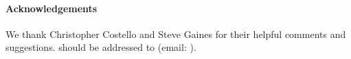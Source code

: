 \documentclass[11pt]{article}
\begin{document}
\newpage

{}


 \paragraph{Acknowledgements} We thank Christopher Costello and Steve Gaines for their helpful comments and suggestions.
should be addressed to (email: ).
\end{document}
